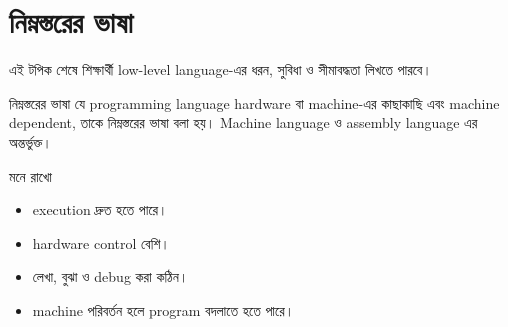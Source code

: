 \section{নিম্নস্তরের ভাষা}

\begin{learningbox}
এই টপিক শেষে শিক্ষার্থী low-level language-এর ধরন, সুবিধা ও সীমাবদ্ধতা লিখতে পারবে।
\end{learningbox}

\begin{definitionbox}{নিম্নস্তরের ভাষা}
যে programming language hardware বা machine-এর কাছাকাছি এবং machine dependent, তাকে নিম্নস্তরের ভাষা বলা হয়। Machine language ও assembly language এর অন্তর্ভুক্ত।
\end{definitionbox}

\begin{center}
\end{center}

\begin{keypointbox}{মনে রাখো}
\begin{itemize}
\item execution দ্রুত হতে পারে।
\item hardware control বেশি।
\item লেখা, বুঝা ও debug করা কঠিন।
\item machine পরিবর্তন হলে program বদলাতে হতে পারে।
\end{itemize}
\end{keypointbox}
